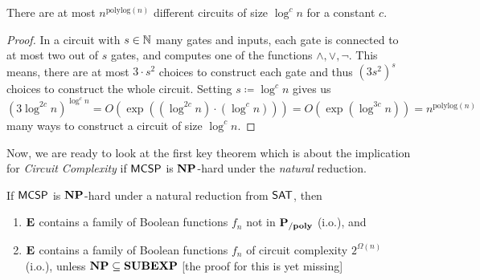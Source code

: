 \documentclass[11pt]{article}
\begin{document}
\begin{lemma}
  \label{lem:num-of-circs}
  There are at most $n^{\mathrm{polylog}(n)}$ different circuits of size
  $\log^c n$ for a constant $c$.
\end{lemma}

\begin{proof}
  In a circuit with $s \in {\mathbb{N}}$ many gates and inputs, each gate is connected to
  at most two out of $s$ gates, and computes one of the functions
  $\land, \lor, \neg$.
  This means, there are at most $3 \cdot s^2$ choices to construct each gate
  and thus $(3 s^2)^s$ choices to construct the whole circuit.
  Setting $s \coloneqq \log^c n$ gives us
  \[
    (3 \log^{2c} n)^{\log^c n}
    =
    O(\exp((\log^{2c} n) \cdot (\log^c n)))
    =
    O(\exp(\log^{3c} n))
    =
    n^{\mathrm{polylog}(n)}
  \]
  many ways to construct a circuit of size $\log^c n$.
\end{proof}

Now, we are ready to look at the first key theorem which is about the implication for \textit{Circuit Complexity} if $\mathsf{MCSP}$ is $\mathbf{NP}$-hard under the \textit{natural} reduction.

\begin{theorem}
	If $\mathsf{MCSP}$ is $\mathbf{NP}$-hard under a natural reduction from $\mathsf{SAT}$, then
	\begin{enumerate} [1.]
		\item $\mathbf{E}$ contains a family of Boolean functions $f_n$ not in $\mathbf{P_{/poly}}$ (i.o.), and
		\item $\mathbf{E}$ contains a family of Boolean functions $f_n$ of circuit complexity $2^{\Omega(n)}$ (i.o.), unless $\mathbf{NP} \subseteq \mathbf{SUBEXP}$
      [the proof for this is yet missing]
	\end{enumerate}
\end{theorem}
\end{document}
